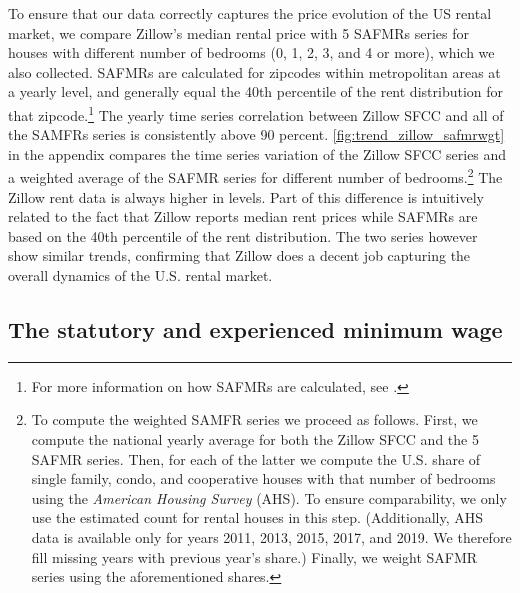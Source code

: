 To ensure that our data correctly captures the price evolution of the US rental market, 
we compare Zillow's median rental price with 5 SAFMRs series for houses with different 
number of bedrooms (0, 1, 2, 3, and 4 or more), which we also collected. SAFMRs are 
calculated for zipcodes within metropolitan areas at a yearly level, and generally equal 
the 40th percentile of the rent distribution for that zipcode.\footnote{For more 
	information on how SAFMRs are calculated, see \textcite[][page 41641]{hudPreamble}.} 
The yearly time series correlation between Zillow SFCC and all of the SAMFRs series is 
consistently above 90 percent. \autoref{fig:trend_zillow_safmrwgt} in the appendix 
compares the time series variation of the Zillow SFCC series and a weighted average of 
the SAFMR series for different number of bedrooms.\footnote{
	\label{foot:zillow_time_series}
	To compute the weighted SAMFR series we proceed as follows. First, we compute the 
	national yearly average for both the Zillow SFCC and the 5 	SAFMR series. Then, for 
	each of the latter we compute the U.S. share of single family, condo, and cooperative 
	houses with that number of bedrooms using the \textit{American Housing Survey} (AHS). 
	To ensure comparability, we only use the estimated count for rental houses in this 
	step. (Additionally, AHS data is available only for years 2011, 2013, 2015, 2017, and 
	2019. We therefore fill missing years with previous year's share.) Finally, we weight 
	SAFMR series using the aforementioned shares.} 
The Zillow rent data is always higher in levels. Part of this difference is intuitively 
related to the fact that Zillow reports median rent prices while SAFMRs are based on the 
40th percentile of the rent distribution. The two series however show similar trends, 
confirming that Zillow does a decent job capturing the overall dynamics of the U.S. rental 
market.

\subsection{The statutory and experienced minimum wage}\label{sec:mw_construction}


